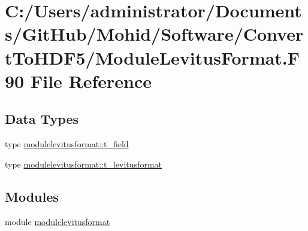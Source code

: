 \hypertarget{_module_levitus_format_8_f90}{}\section{C\+:/\+Users/administrator/\+Documents/\+Git\+Hub/\+Mohid/\+Software/\+Convert\+To\+H\+D\+F5/\+Module\+Levitus\+Format.F90 File Reference}
\label{_module_levitus_format_8_f90}
\subsection*{Data Types}
\begin{DoxyCompactItemize}
\item 
type \mbox{\hyperlink{structmodulelevitusformat_1_1t__field}{modulelevitusformat\+::t\+\_\+field}}
\item 
type \mbox{\hyperlink{structmodulelevitusformat_1_1t__levitusformat}{modulelevitusformat\+::t\+\_\+levitusformat}}
\end{DoxyCompactItemize}
\subsection*{Modules}
\begin{DoxyCompactItemize}
\item 
module \mbox{\hyperlink{namespacemodulelevitusformat}{modulelevitusformat}}
\end{DoxyCompactItemize}
